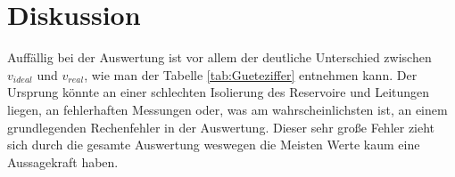 \section{Diskussion}
\label{sec:Diskussion}
Auffällig bei der Auswertung ist vor allem der deutliche Unterschied zwischen $ v_{ideal} $ und $ v_{real} $, wie man der Tabelle \ref{tab:Gueteziffer} entnehmen kann.
Der Ursprung könnte an einer schlechten Isolierung des Reservoire und Leitungen liegen, an fehlerhaften Messungen oder, was am wahrscheinlichsten ist, an einem grundlegenden Rechenfehler in der Auswertung. 
Dieser sehr große Fehler zieht sich durch die gesamte Auswertung weswegen die Meisten Werte kaum eine Aussagekraft haben.